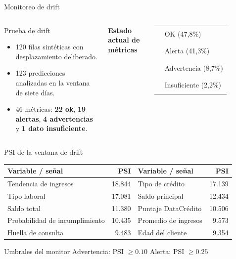 \documentclass[aspectratio=169]{beamer}
\begin{document}
\begin{frame}{Monitoreo de drift}
\begin{columns}[T]
\begin{block}{Prueba de drift}
\begin{itemize}
  \item 120 filas sintéticas con desplazamiento deliberado.
  \item 123 predicciones analizadas en la ventana de siete días.
  \item 46 métricas: \textbf{22 ok}, \textbf{19 alertas}, \textbf{4 advertencias} y \textbf{1 dato insuficiente}.
\end{itemize}
\end{block}
\centering
\textbf{Estado actual de métricas}\\[0.2cm]

\vspace{0.2cm}
\scriptsize
\begin{tabular}{ll}
\textcolor{creditgreen}{\rule{0.23cm}{0.23cm}} & OK (47,8\%)\\
\textcolor{red!72}{\rule{0.23cm}{0.23cm}} & Alerta (41,3\%)\\
\textcolor{creditorange}{\rule{0.23cm}{0.23cm}} & Advertencia (8,7\%)\\
\textcolor{gray!55}{\rule{0.23cm}{0.23cm}} & Insuficiente (2,2\%)
\end{tabular}
\end{columns}
\end{frame}

\begin{frame}{PSI de la ventana de drift}
\centering
\small
\begin{tabular}{lrlr}
\toprule
Variable / señal & PSI & Variable / señal & PSI \\
\midrule
Tendencia de ingresos & 18.844 & Tipo de crédito & 17.139 \\
Tipo laboral & 17.081 & Saldo principal & 12.434 \\
Saldo total & 11.380 & Puntaje DataCrédito & 10.506 \\
Probabilidad de incumplimiento & 10.435 & Promedio de ingresos & 9.573 \\
Huella de consulta & 9.483 & Edad del cliente & 9.354 \\
\bottomrule
\end{tabular}
\vspace{0.45cm}
\begin{block}{Umbrales del monitor}
\centering
\small Advertencia: PSI $\geq 0.10$ \hspace{1cm} Alerta: PSI $\geq 0.25$
\end{block}
\end{frame}
\end{document}
